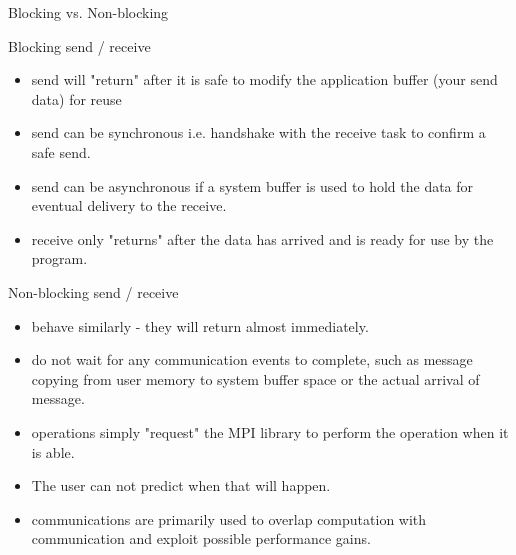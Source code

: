 \documentclass[10pt,t]{beamer}
\begin{document}
\begin{frame}[allowframebreaks]{Blocking vs. Non-blocking}
  \begin{block}{Blocking send / receive }
    \begin{itemize}
      \item send will "return" after it is safe to modify the application buffer (your send data) for reuse
      \item send can be synchronous i.e. handshake with the receive task to confirm a safe send.
      \item send can be asynchronous if a system buffer is used to hold the data for eventual delivery to the receive.
      \item receive only "returns" after the data has arrived and is ready for use by the program.
    \end{itemize}
  \end{block}

  \framebreak

  \begin{block}{Non-blocking send / receive}
    \begin{itemize}
      \item behave similarly - they will return almost immediately. 
      \item do not wait for any communication events to complete, such as message copying from user memory to system buffer space or the actual arrival of message.
      \item operations simply "request" the MPI library to perform the operation when it is able. 
      \item[] The user can not predict when that will happen.
      \item communications are primarily used to overlap computation with communication and exploit possible performance gains.
    \end{itemize}
  \end{block}

  \framebreak


\end{frame}
\end{document}
